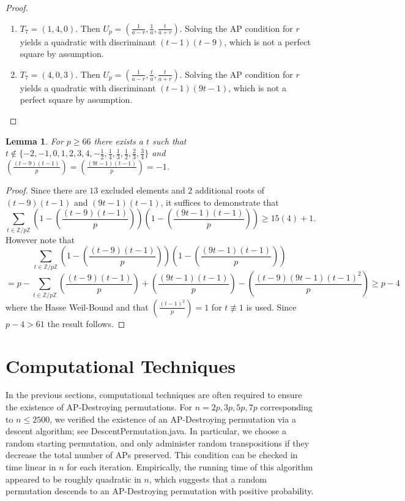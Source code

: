 \documentclass[12pt]{amsart}
\newtheorem{lemma}[thm]{Lemma}
\theoremstyle{definition}
\theoremstyle{remark}
\newcommand{\Z}{\mathbb Z}
\begin{document}
\begin{proof}
\begin{enumerate}
\begin{enumerate}
\item $T_7=(1, 4, 0)$. Then $U_p=(\frac{1}{a-r}, \frac{1}{a}, \frac{t}{a+r})$. Solving the AP condition for $r$ yields a quadratic with discriminant $(t-1)(t-9)$, which is not a perfect square by assumption.
\item $T_7=(4, 0, 3)$. Then $U_p=(\frac{1}{a-r}, \frac{t}{a}, \frac{t}{a+r})$. Solving the AP condition for $r$ yields a quadratic with discriminant $(t-1)(9t-1)$, which is not a perfect square by assumption.
\end{enumerate}
\end{enumerate}
\end{proof}
\begin{lemma}
For $p\ge 66$ there exists a $t$ such that $t\notin \{-2, -1, 0, 1, 2, 3, 4, -\frac{1}{2}, \frac{1}{4}, \frac{1}{3}, \frac{1}{2},\frac{2}{3}, \frac{3}{4}\}$ and $(\frac{(t-9)(t-1)}{p})=(\frac{(9t-1)(t-1)}{p})=-1$.
\end{lemma}
\begin{proof}
Since there are $13$ excluded elements and $2$ additional roots of $(t-9)(t-1)$ and $(9t-1)(t-1)$, it suffices to demonstrate that \[\sum_{t\in \Z/p\Z}(1-(\frac{(t-9)(t-1)}{p}))(1-(\frac{(9t-1)(t-1)}{p}))\ge 15(4)+1.\] However note that \[\sum_{t\in \Z/p\Z}(1-(\frac{(t-9)(t-1)}{p}))(1-(\frac{(9t-1)(t-1)}{p}))\]\[=p-\sum_{t\in \Z/p\Z}(\frac{(t-9)(t-1)}{p})+ (\frac{(9t-1)(t-1)}{p})-(\frac{(t-9)(9t-1)(t-1)^2}{p})\ge p-4\] where the Hasse Weil-Bound and that $(\frac{(t-1)^2}{p})=1$ for $t\nequiv 1$ is used. Since $p-4>61$ the result follows.
\end{proof}
\section{Computational Techniques}
In the previous sections, computational techniques are often required to ensure the existence of AP-Destroying permutations. For $n=2p, 3p, 5p, 7p$ corresponding to $n\le 2500$, we  verified the existence of an AP-Destroying permutation via a descent algorithm; see DescentPermutation.java. In particular, we choose a random starting permutation, and only administer random transpositions if they decrease the total number of APs preserved. This condition can be checked in time linear in $n$ for each iteration. Empirically, the running time of this algorithm appeared to be roughly quadratic in $n$, which suggests that a random permutation descends to an AP-Destroying permutation with positive probability.
\end{document}
